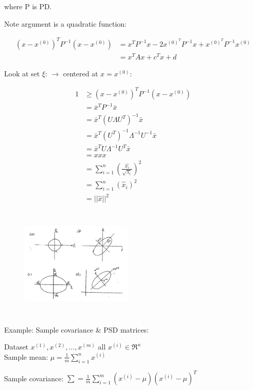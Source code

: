 where P is PD.

Note argument is a quadratic function:

\begin{align*}
(x - x^{(0)})^TP^{-1}(x - x^{(0)}) &= x^TP^{-1}x - 2x^{(0)^T}P^{-1}x + x^{(0)^T}P^{-1}x^{(0)}\\
&= x^TAx + c^Tx + d
\end{align*}

Look at set $\xi$: $\rightarrow$ centered at $x = x^{(0)}$:

\begin{align*}
1 &\geq (x - x^{(0)})^TP^{-1}(x - x^{(0)})\\
&= \bar{x}^TP^{-1}\bar{x}\\
&= \bar{x}^T(U\Lambda U^T)^{-1}\bar{x}\\
&= \bar{x}^T(U^T)^{-1}\Lambda^{-1}U^{-1}\bar{x}\\
&= \bar{x}^TU\Lambda^{-1}U^T\bar{x}\\
&= xxx\\
&= \sum^n_{i=1}(\frac{\hat{x_i}}{\sqrt{\lambda_i}})^2\\
&= \sum^n_{i=1}(\hat{x}_i)^2\\
&= ||\hat{x}||^2
\end{align*}


\begin{figure}
	\centering
	\includegraphics[width=2.1in,height=2.1in]{figures/ch03/figure2.jpg}
\end{figure}

Example: Sample covariance \& PSD matrices: 

Dataset $x^{(1)}, x^{(2)}, ..., x^{(m)}$ all $x^{(i)}\in \Re^n$\\

Sample mean: $\mu = \frac{1}{m}\sum^n_{i=1}x^{(i)}$

Sample covariance: $\sum = \frac{1}{m}\sum^m_{i=1}(x^{(i)}-\mu)(x^{(i)}-\mu)^T$

